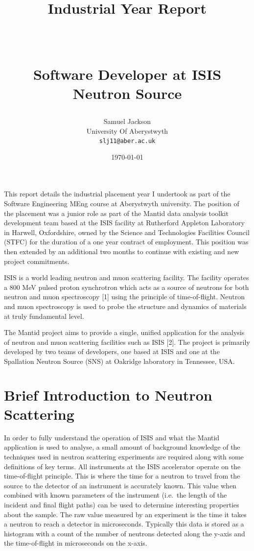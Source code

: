 \documentclass[paper=a4, fontsize=11pt]{scrartcl}	%
\title{
	\vspace{-1in} 	\usefont{OT1}{bch}{b}{n}
	\huge \strut Industrial Year Report \strut \\
	\Large \bfseries \strut Software Developer at ISIS Neutron Source \strut
}
\author{
	\usefont{OT1}{bch}{m}{n} Samuel Jackson
	\\ \usefont{OT1}{bch}{m}{n} University Of Aberystwyth
	\\   \texttt{slj11@aber.ac.uk}
}
\date{\today}
\numberwithin{equation}{section}															%
\numberwithin{figure}{section}																%
\numberwithin{table}{section}
\begin{document}
	\maketitle
	\clearpage
	\tableofcontents
	\clearpage

This report details the industrial placement year I undertook as part of
the Software Engineering MEng course at Aberystwyth university. The
position of the placement was a junior role as part of the Mantid data
analysis toolkit development team based at the ISIS facility at
Rutherford Appleton Laboratory in Harwell, Oxfordshire, owned by the
Science and Technologies Facilities Council (STFC) for the duration of a
one year contract of employment. This position was then extended by an
additional two months to continue with existing and new project
commitments.

ISIS is a world leading neutron and muon scattering facility. The
facility operates a 800 MeV pulsed proton synchrotron which acts as a
source of neutrons for both neutron and muon spectroscopy {[}1{]} using
the principle of time-of-flight. Neutron and muon spectroscopy is used
to probe the structure and dynamics of materials at truly fundamental
level.

The Mantid project aims to provide a single, unified application for the
analysis of neutron and muon scattering facilities such as ISIS {[}2{]}.
The project is primarily developed by two teams of developers, one based
at ISIS and one at the Spallation Neutron Source (SNS) at Oakridge
laboratory in Tennessee, USA.

\section{Brief Introduction to Neutron
Scattering}\label{brief-introduction-to-neutron-scattering}

In order to fully understand the operation of ISIS and what the Mantid
application is used to analyse, a small amount of background knowledge
of the techniques used in neutron scattering experiments are required
along with some definitions of key terms. All instruments at the ISIS
accelerator operate on the time-of-flight principle. This is where the
time for a neutron to travel from the source to the detector of an
instrument is accurately known. This value when combined with known
parameters of the instrument (i.e.~the length of the incident and final
flight paths) can be used to determine interesting properties about the
sample. The raw value measured by an experiment is the time it takes a
neutron to reach a detector in microseconds. Typically this data is
stored as a histogram with a count of the number of neutrons detected
along the y-axis and the time-of-flight in microseconds on the x-axis.
\end{document}

